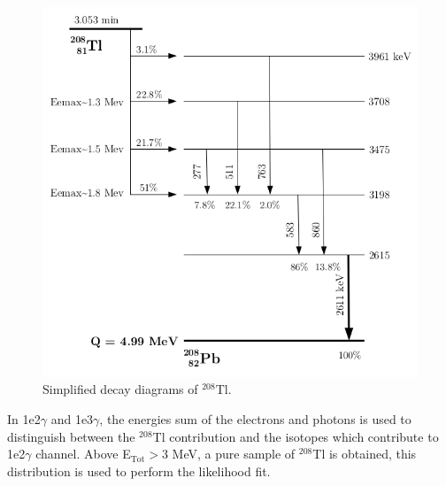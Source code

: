 \documentclass[main.tex]{subfiles}
\begin{document}
\begin{figure}[h!]
\centering
\includegraphics[scale=0.33]{pictures/Chap6/decay-tl208.png}
\caption{Simplified decay diagrams of $^{\text{208}}$Tl.}
\label{Tl208-decay-schema}
\end{figure}


\NI In 1e2$\gamma$ and 1e3$\gamma$, the energies sum of the electrons and photons is used to distinguish between the $^{\text{208}}$Tl contribution and the isotopes which contribute to 1e2$\gamma$ channel. Above E$_{\text{Tot}} > $3 MeV, a pure sample of $^{\text{208}}$Tl is obtained, this distribution is used to perform the likelihood fit.
\end{document}
